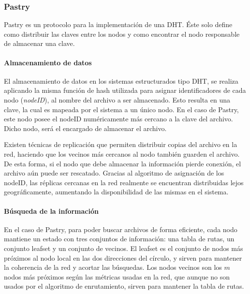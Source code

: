\subsubsection{Pastry}
\label{sec:pastry}
Pastry es un protocolo para la implementación de una DHT. Éste solo define como
distribuir las claves entre los nodos y como encontrar el nodo responsable de almacenar una clave.

\paragraph{Almacenamiento de datos}

El almacenamiento de datos en los sistemas estructurados tipo DHT, se realiza
aplicando la misma función de hash utilizada para asignar identificadores de
cada nodo (\textit{nodeID}), al nombre del archivo a ser almacenado. Esto resulta en una
clave, la cual es mapeada por el sistema a un único nodo. En el caso de Pastry,
este nodo posee el nodeID numéricamente más cercano a la clave del archivo.
Dicho nodo, será el encargado de almacenar el archivo.

Existen técnicas de replicación que permiten distribuir copias del archivo en
la red, haciendo que los vecinos más cercanos al nodo también guarden el
archivo. De esta forma, si el nodo que debe almacenar la información pierde
conexión, el archivo aún puede ser rescatado. Gracias al algoritmo de
asignación de los nodeID, las réplicas cercanas en la red realmente se
encuentran distribuidas lejos geográficamente, aumentando la disponibilidad de
las mismas en el sistema.


\paragraph{Búsqueda de la información}

 En el caso de Pastry, para poder buscar archivos de forma eficiente, cada nodo mantiene un
estado con tres conjuntos de información: una tabla de rutas, un conjunto
leafset y un conjunto de vecinos.
El leafset es el conjunto de nodos más próximos al nodo local en las dos
direcciones del círculo, y sirven para mantener la coherencia de la red y acortar las
búsquedas. Los nodos vecinos son los $m$ nodos más próximos según las
métricas usadas en la red, que aunque no son usados por el algoritmo de
enrutamiento, sirven para mantener la tabla de rutas.

